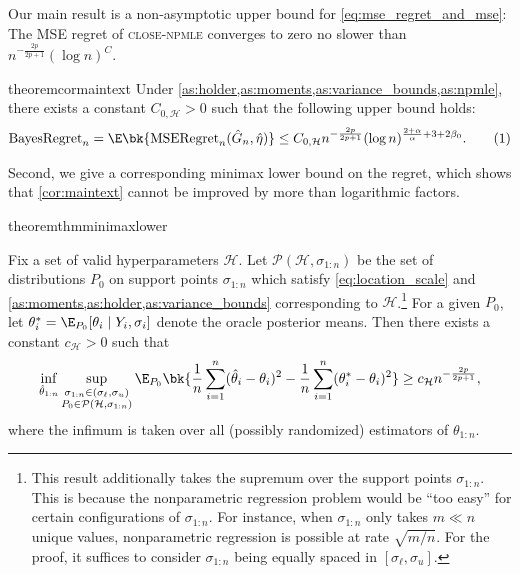 \documentclass[12pt, reqno]{amsart}
\newcommand\numberthis{\addtocounter{equation}{1}\tag{\theequation}}
\newcommand{\sigl}{\sigma_\ell}
\newcommand{\sigu}{\sigma_u}
\newcommand{\Hyperparams}{\mathcal{H}}
\newcommand{\hateta}{\hat\eta}
\newcommand{\regret}{\mathrm{BayesRegret}_n}
\newcommand{\reg}{\mathrm{MSERegret}_n}
\newcommand{\close}{\textsc{close}}
\newcommand{\npmle}{\textsc{npmle}}
\newcommand{\closenpmle}{\close-\npmle}
\numberwithin{equation}{section}
\begin{document}
Our main result is a non-asymptotic upper bound for \eqref{eq:mse_regret_and_mse}: The MSE
regret of 
\closenpmle{}
converges to zero no slower than 
$n^{-\frac{2p}{2p+1}}(\log n)^{C}$.

\begin{restatable}{theorem}{cormaintext}
\label{cor:maintext}
Under \cref{as:holder,as:moments,as:variance_bounds,as:npmle}, there exists a
constant $C_{0, \Hyperparams} > 0$ such that the following upper bound holds:\[
\regret = \E\bk{
    \reg(\hat G_n, \hateta) } \le C_{0, \Hyperparams} n^{-\frac{2p}{2p+1}} (\log n)^{\frac{2+\alpha}{\alpha} + 3 + 2\beta_0}.
    \numberthis \label{eq:regret_rate_final}
\]
\end{restatable}



Second, we give a corresponding minimax lower bound on the regret, which shows that
\cref{cor:maintext} cannot be improved by more than logarithmic factors.







\begin{restatable}{theorem}{thmminimaxlower}
\label{thm:minimaxlower}

Fix a set of valid hyperparameters $\Hyperparams$. Let $\mathcal P (\Hyperparams, \sigma_{1:n})$ be the set of
distributions $P_0$ on support points $\sigma_{1:n}$ which satisfy
\eqref{eq:location_scale}
and  \cref{as:moments,as:holder,as:variance_bounds} corresponding to
$\Hyperparams$.\footnote{This result additionally takes the supremum over the
support points $\sigma_{1:n}$. This is because the nonparametric regression problem would
be ``too easy'' for certain configurations of $\sigma_{1:n}$. For instance, when
$\sigma_{1:n}$ only takes $m \ll n$ unique values, nonparametric regression is possible at
rate $\sqrt{m/n}$. For the proof, it suffices to consider $\sigma_{1:n}$ being equally
spaced in $
[\sigl, \sigu]$. } For a given $P_0$, let
$\theta_i^* = \E_{P_0}[\theta_i \mid Y_i,
\sigma_i]$ denote the oracle posterior means. Then there exists a constant $c_
 {\Hyperparams} > 0$ such that
\[
\inf_{\hat\theta_{1:n}} \sup_{\substack{\sigma_{1:n} \in (\sigl, \sigu)\\ P_0 \in \mathcal
P(\mathcal
H, \sigma_{1:n})}} \E_{P_0} \bk{
    \frac{1}{n} \sum_{i=1}^n (\hat\theta_{i} - \theta_i)^2 - \frac{1}{n} \sum_{i=1}^n 
    (\theta_{i}^* - \theta_i)^2
} \ge c_\Hyperparams n^{-\frac{2p}{2p+1}},
\]
where the infimum is taken over all (possibly randomized) estimators of $\theta_{1:n}$.
\end{restatable}
\end{document}
